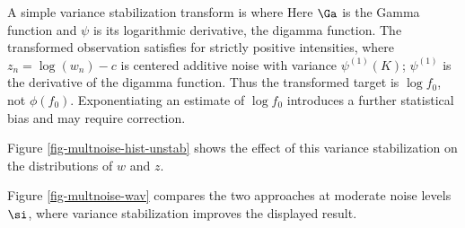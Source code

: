 A simple variance stabilization transform is
where
Here $\Ga$ is the Gamma function and $\psi$ is its logarithmic derivative, the digamma function. The transformed observation satisfies
for strictly positive intensities, where $z_n=\log(w_n)-c$ is centered additive noise with variance $\psi^{(1)}(K)$; $\psi^{(1)}$ is the derivative of the digamma function. Thus the transformed target is $\log f_0$, not $\phi(f_0)$. Exponentiating an estimate of $\log f_0$ introduces a further statistical bias and may require correction.


Figure \ref{fig-multnoise-hist-unstab} shows the effect of this variance stabilization on the distributions of $w$ and $z$.

Figure \ref{fig-multnoise-wav} compares the two approaches at moderate noise levels $\si$, where variance stabilization improves the displayed result.



